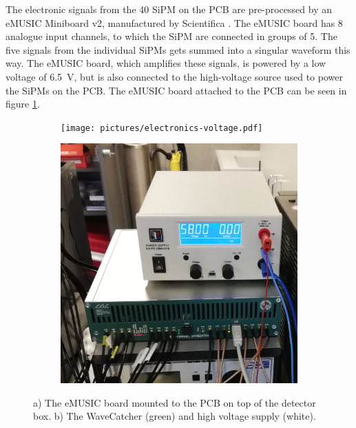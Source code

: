The electronic signals from the 40 \ac{SiPM} on the \ac{PCB} are pre-processed by an eMUSIC Miniboard v2, manufactured by Scientifica \cite{scientifica}. The eMUSIC board has 8 analogue input channels, to which the \acs{SiPM} are connected in groups of 5. The five signals from the individual \acsp{SiPM} gets summed into a singular waveform this way. The eMUSIC board, which amplifies these signals, is powered by a low voltage of \SI{6.5}{\volt}, but is also connected to the high-voltage source used to power the \acsp{SiPM} on the \ac{PCB}.
The eMUSIC board attached to the \ac{PCB} can be seen in figure \ref{fig:electronics}.



\begin{figure}[h]
	\centering
	\begin{subfigure}{.4\textwidth}
		\centering
		\texttt{[image: pictures/electronics-voltage.pdf]}
		\caption{}
	\end{subfigure}\hfill%
	\begin{subfigure}{.5\textwidth}
		\centering
		\includegraphics[width=\textwidth]{pictures/wavecatcher.pdf}
		\caption{}
	\end{subfigure}
	\caption{a) The eMUSIC board mounted to the PCB on top of the detector box. b) The WaveCatcher (green) and high voltage supply (white).}
	\label{fig:electronics}
\end{figure}

